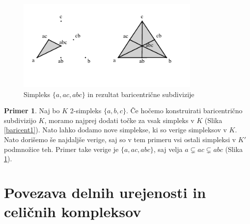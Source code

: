\documentclass[a4paper, 12pt]{book}
\theoremstyle{definition}
\newtheorem{example}{Primer}[section]
\begin{document}
\begin{figure}[h]
  \begin{center}
  \includegraphics[width=0.8\textwidth]{baricentricna2.pdf}
  \end{center}
  \caption{Simpleks $\{a, ac, abc\}$ in rezultat baricentrične subdivizije}
  \label{baricent2}
\end{figure}
\begin{example}
  Naj bo $K$ 2-simpleks $\{a,b,c\}$. Če hočemo konstruirati baricentrično subdivizijo $K$,
  moramo najprej dodati točke za vsak simpleks v $K$ (Slika \ref{baricent1}).
  Nato lahko dodamo nove simplekse, ki so verige simpleksov v $K$.
  Nato dorišemo še najdaljše verige, saj so v tem primeru vsi ostali simpleksi v $K'$ podmnožice teh.
  Primer take verige je $\{a, ac, abc\}$, saj velja $a \subsetneq ac \subsetneq abc$ (Slika \ref{baricent2}).
\end{example}

\section{Povezava delnih urejenosti in celičnih kompleksov}
\end{document}
